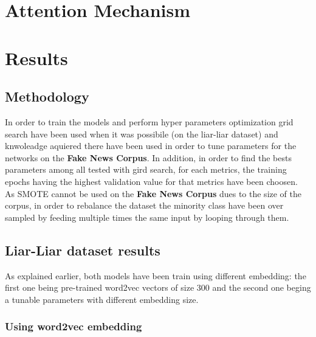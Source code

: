 \section{Attention Mechanism}

\section{Results}
\subsection{Methodology}
In order to train the models and perform hyper parameters optimization grid search have been used when it was possibile (on the liar-liar dataset) and knwoleadge aquiered there have been used in order to tune parameters for the networks on the \textbf{Fake News Corpus}. In addition, in order to find the bests parameters among all tested with gird search, for each metrics, the training epochs having the highest validation value for that metrics have been choosen. \\

As SMOTE cannot be used on the \textbf{Fake News Corpus} dues to the size of the corpus, in order to rebalance the dataset the minority class have been over sampled by feeding multiple times the same input by looping through them. 
\subsection{Liar-Liar dataset results}
As explained earlier, both models have been train using different embedding: the first one being pre-trained word2vec vectors of size 300 and the second one beging a tunable parameters with different embedding size.
\subsubsection{Using word2vec embedding}
